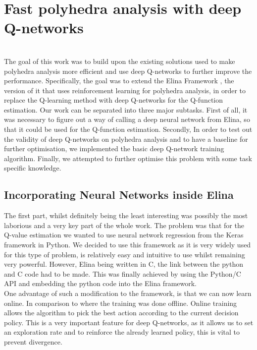 
\chapter{Fast polyhedra analysis with deep Q-networks}
\mbox{}\\
The goal of this work was to build upon the existing solutions used to make polyhedra analysis more efficient and use deep Q-networks to further improve the performance. Specifically, the goal was to extend the Elina Framework \cite{elina}, the version of it that uses reinforcement learning for polyhedra analysis, in order to replace the Q-learning method with deep Q-networks for the Q-function estimation. Our work can be separated into three major subtasks. First of all, it was necessary to figure out a way of calling a deep neural network from Elina, so that it could be used for the Q-function estimation. Secondly, In order to test out the validity of deep Q-networks on polyhedra analysis and to have a baseline for further optimisation, we implemented the basic deep Q-network training algorithm. Finally, we attempted to further optimise this problem with some task specific knowledge.

\section{Incorporating Neural Networks inside Elina}
The first part, whilst definitely being the least interesting was possibly the most laborious and a very key part of the whole work. The problem was that for the Q-value estimation we wanted to use neural network regression from the Keras framework in Python. We decided to use this framework as it is very widely used for this type of problem, is relatively easy and intuitive to use whilst remaining very powerful. However, Elina being written in C, the link between the python and C code had to be made. This was finally achieved  by using the Python/C API and embedding the python code into the Elina framework.\\
One advantage of such a modification to the framework, is that we can now learn online. In comparison to \cite{singh2018fast} where the training was done offline. Online training allows the algorithm to pick the best action according to the current decision policy. This is a very important feature for deep Q-networks, as it allows us to set an exploration rate and to reinforce the already learned policy, this is vital to prevent divergence.
